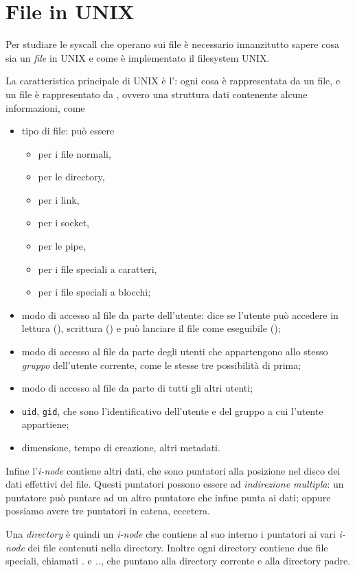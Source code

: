 \section{File in UNIX}
Per studiare le syscall che operano sui file è necessario innanzitutto sapere cosa sia un \emph{file} in UNIX e come è implementato il filesystem UNIX.

La caratteristica principale di UNIX è l': ogni cosa è rappresentata da un file, e un file è rappresentato da , ovvero una struttura dati contenente alcune informazioni, come \begin{itemize}
    \item tipo di file: può essere \begin{itemize}
        \item \strong{-} per i file normali,
        \item {} per le directory,
        \item {} per i link,
        \item {} per i socket,
        \item {} per le pipe,
        \item {} per i file speciali a caratteri,
        \item {} per i file speciali a blocchi;
    \end{itemize}
    \item modo di accesso al file da parte dell'utente: dice se l'utente può accedere in lettura (), scrittura () e può lanciare il file come eseguibile ();
    \item modo di accesso al file da parte degli utenti che appartengono allo stesso \emph{gruppo} dell'utente corrente, come le stesse tre possibilità di prima;
    \item modo di accesso al file da parte di tutti gli altri utenti;
    \item \texttt{uid}, \texttt{gid}, che sono l'identificativo dell'utente e del gruppo a cui l'utente appartiene;
    \item dimensione, tempo di creazione, altri metadati.
\end{itemize}

Infine l'\emph{i-node} contiene altri dati, che sono puntatori alla posizione nel disco dei dati effettivi del file. Questi puntatori possono essere ad \emph{indirezione multipla}: un puntatore può puntare ad un altro puntatore che infine punta ai dati; oppure possiamo avere tre puntatori in catena, eccetera. 

Una \emph{directory} è quindi un \emph{i-node} che contiene al suo interno i puntatori ai vari \emph{i-node} dei file contenuti nella directory. Inoltre ogni directory contiene due file speciali, chiamati \emph{.} e \emph{..}, che puntano alla directory corrente e alla directory padre.